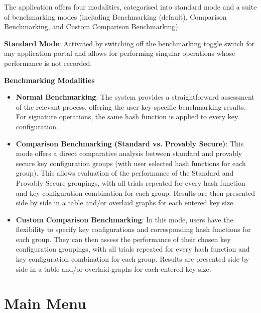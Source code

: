 \documentclass[]{final_report}
\begin{document}
The application offers four modalities, categorised into standard mode and a suite of benchmarking modes (including Benchmarking (default), Comparison Benchmarking, and Custom Comparison Benchmarking). 

\textbf{Standard Mode}: Activated by switching off the benchmarking toggle switch for any application portal and allows for performing singular operations whose performance is not recorded.

\textbf{Benchmarking Modalities}

\begin{itemize}
    \item \textbf{Normal Benchmarking}: The system provides a straightforward assessment of the relevant process, offering the user key-specific benchmarking results. For signature operations, the same hash function is applied to every key configuration.
        \item \textbf{Comparison Benchmarking (Standard vs. Provably Secure)}: This mode offers a direct comparative analysis between standard and provably secure key configuration groups (with user selected hash functions for each group). This allows evaluation of the performance of the Standard and Provably Secure groupings, with all trials repeated for every hash function and key configuration combination for each group. Results are then presented side by side in a table and/or overlaid graphs for each entered key size. 
     \item \textbf{Custom Comparison Benchmarking}: In this mode, users have the flexibility to specify key configurations and corresponding hash functions for each group. They can then assess the performance of their chosen key configuration groupings, with all trials repeated for every hash function and key configuration combination for each group. Results are presented side by side in a table and/or overlaid graphs for each entered key size.
\end{itemize}


\chapter{Main Menu}
\end{document}
